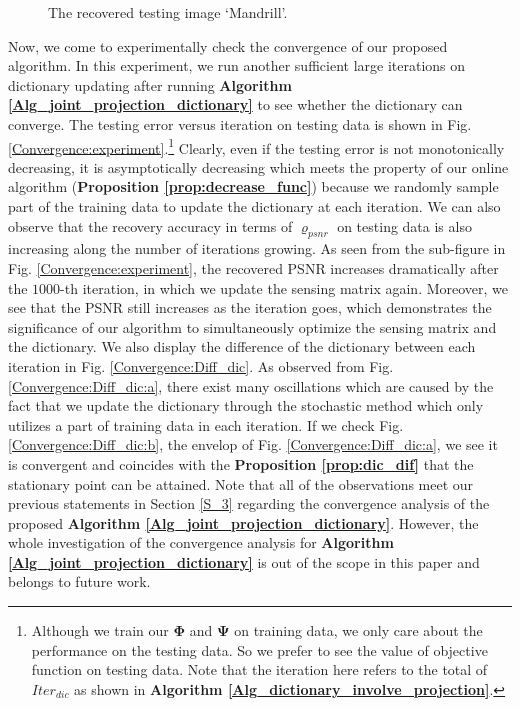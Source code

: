 \documentclass[final,5p,times,twocolumn]{elsarticle}
\begin{document}
\begin{figure}[!htb]
	\centering
	\caption{The recovered testing image `Mandrill'.}\label{Mandril:reconst}
\end{figure}

Now, we come to experimentally check the convergence of our proposed algorithm. In this experiment, we run another sufficient large iterations on dictionary updating after running {\bf Algorithm \ref{Alg_joint_projection_dictionary}} to see whether the dictionary can converge. The testing error versus iteration on testing data is shown in Fig. \ref{Convergence:experiment}.\footnote{Although we train our $\bm\Phi$ and $\bm\Psi$ on training data, we only care about the performance on the testing data. So we prefer to see the value of objective function on testing data. Note that the iteration here refers to the total of $Iter_{dic}$ as shown in {\bf Algorithm \ref{Alg_dictionary_involve_projection}}.}  Clearly, even if the testing error is not monotonically decreasing, it is asymptotically decreasing which meets the property of our online algorithm ({\bf Proposition \ref{prop:decrease_func}}) because we randomly sample part of the training data to update the dictionary at each iteration. We can also observe that the recovery accuracy in terms of $\varrho_{psnr}$ on testing data is also increasing along the number of iterations growing. {As seen from the sub-figure in Fig. \ref{Convergence:experiment}, the recovered PSNR increases dramatically after the $1000$-th iteration, in which we update the sensing matrix again. Moreover, we see that the PSNR still increases as the iteration goes, which demonstrates the significance of our algorithm to simultaneously optimize the sensing matrix and the dictionary.}  {We also display the difference of the dictionary between each iteration in Fig. \ref{Convergence:Diff_dic}. As observed from Fig. \ref{Convergence:Diff_dic:a}, there exist many oscillations which are caused by the fact that we update the dictionary through the stochastic method which only utilizes a part of training data in each iteration. If we check Fig. \ref{Convergence:Diff_dic:b}, the envelop of Fig. \ref{Convergence:Diff_dic:a}, we see it is convergent and coincides with the {\bf Proposition \ref{prop:dic_dif}} that the stationary point can be attained.} Note that all of the observations meet our previous statements in Section \ref{S_3} regarding the convergence analysis of the proposed {\bf Algorithm \ref{Alg_joint_projection_dictionary}}. However, the whole investigation of the convergence analysis for {\bf Algorithm \ref{Alg_joint_projection_dictionary}} is out of the scope in this paper and belongs to future work.
\end{document}
